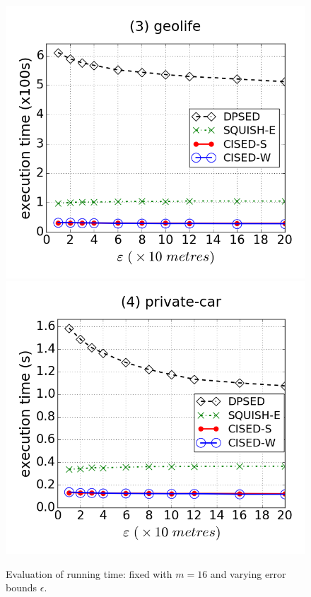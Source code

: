 \begin{figure}[tb!]
\includegraphics[scale = 0.240]{figures/Exp-time-epsilon-geolife.png}
\includegraphics[scale = 0.240]{figures/Exp-time-epsilon-private.png}
\vspace{-1ex}
\caption{\small Evaluation of running time: fixed with $m=16$ and varying error bounds $\epsilon$.}
\label{fig:time-epsilon}
\vspace{-1ex}
\end{figure}



